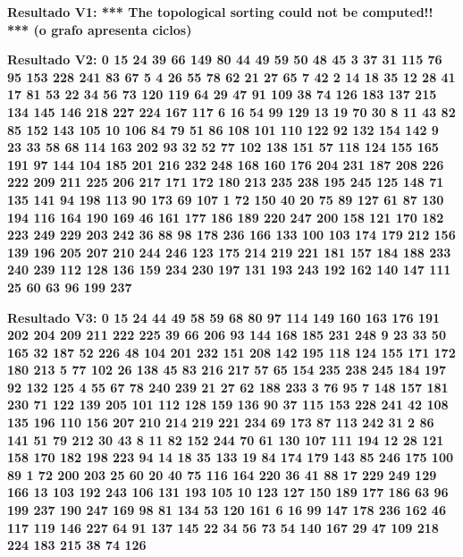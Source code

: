\documentclass{report}
\begin{document}
{

\normalsize

\textbf{Resultado V1:  *** The topological sorting could not be computed!! *** (o grafo apresenta ciclos)}

\hfill

\textbf{Resultado V2: 0 15 24 39 66 149 80 44 49 59 50 48 45 3 37 31 115 76 95 153 228 241 83 67 5 4 26 55 78 62 21 27 65 7 42 2 14 18 35 12 28 41 17 81 53 22 34 56 73 120 119 64 29 47 91 109 38 74 126 183 137 215 134 145 146 218 227 224 167 117 6 16 54 99 129 13 19 70 30 8 11 43 82 85 152 143 105 10 106 84 79 51 86 108 101 110 122 92 132 154 142 9 23 33 58 68 114 163 202 93 32 52 77 102 138 151 57 118 124 155 165 191 97 144 104 185 201 216 232 248 168 160 176 204 231 187 208 226 222 209 211 225 206 217 171 172 180 213 235 238 195 245 125 148 71 135 141 94 198 113 90 173 69 107 1 72 150 40 20 75 89 127 61 87 130 194 116 164 190 169 46 161 177 186 189 220 247 200 158 121 170 182 223 249 229 203 242 36 88 98 178 236 166 133 100 103 174 179 212 156 139 196 205 207 210 244 246 123 175 214 219 221 181 157 184 188 233 240 239 112 128 136 159 234 230 197 131 193 243 192 162 140 147 111 25 60 63 96 199 237 }

\hfill

\textbf{Resultado V3: 0 15 24 44 49 58 59 68 80 97 114 149 160 163 176 191 202 204 209 211 222 225 39 66 206 93 144 168 185 231 248 9 23 33 50 165 32 187 52 226 48 104 201 232 151 208 142 195 118 124 155 171 172 180 213 5 77 102 26 138 45 83 216 217 57 65 154 235 238 245 184 197 92 132 125 4 55 67 78 240 239 21 27 62 188 233 3 76 95 7 148 157 181 230 71 122 139 205 101 112 128 159 136 90 37 115 153 228 241 42 108 135 196 110 156 207 210 214 219 221 234 69 173 87 113 242 31 2 86 141 51 79 212 30 43 8 11 82 152 244 70 61 130 107 111 194 12 28 121 158 170 182 198 223 94 14 18 35 133 19 84 174 179 143 85 246 175 100 89 1 72 200 203 25 60 20 40 75 116 164 220 36 41 88 17 229 249 129 166 13 103 192 243 106 131 193 105 10 123 127 150 189 177 186 63 96 199 237 190 247 169 98 81 134 53 120 161 6 16 99 147 178 236 162 46 117 119 146 227 64 91 137 145 22 34 56 73 54 140 167 29 47 109 218 224 183 215 38 74 126 }

}
\end{document}
